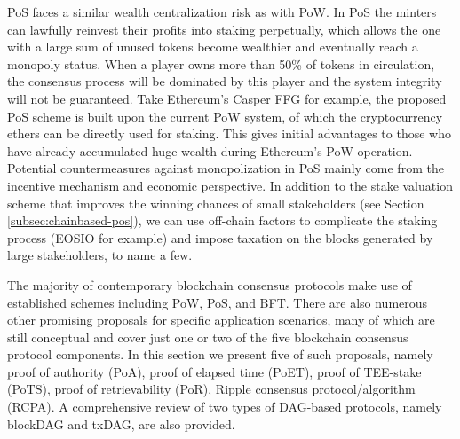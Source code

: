 PoS faces a similar wealth centralization risk as with PoW. In PoS the minters can lawfully reinvest their profits into staking perpetually, which allows the one with a large sum of unused tokens become wealthier and eventually reach a monopoly status. When a player owns more than 50\% of tokens in circulation, the consensus process will be dominated by this player and the system integrity will not be guaranteed. Take Ethereum's Casper FFG for example, the proposed PoS scheme is built upon the current PoW system, of which the cryptocurrency ethers can be directly used for staking. This gives initial advantages to those who have already accumulated huge wealth during Ethereum's PoW operation.
Potential countermeasures against monopolization in PoS mainly come from the incentive mechanism and economic perspective. In addition to the stake valuation scheme that improves the winning chances of small stakeholders (see Section \ref{subsec:chainbased-pos}), we can use off-chain factors to complicate the staking process (EOSIO for example) and impose taxation on the blocks generated by large stakeholders, to name a few.

\label{sec:other-promising}
The majority of contemporary blockchain consensus protocols make use of established schemes including PoW, PoS, and BFT. There are also numerous other promising proposals for specific application scenarios, many of which are still conceptual and cover just one or two of the five blockchain consensus protocol components. In this section we present five of such proposals, namely proof of authority (PoA), proof of elapsed time (PoET), proof of TEE-stake (PoTS), proof of retrievability (PoR), Ripple consensus protocol/algorithm (RCPA).
{\color{\rcolor}
A comprehensive review of two types of DAG-based protocols, namely blockDAG and txDAG, are also provided.
}

